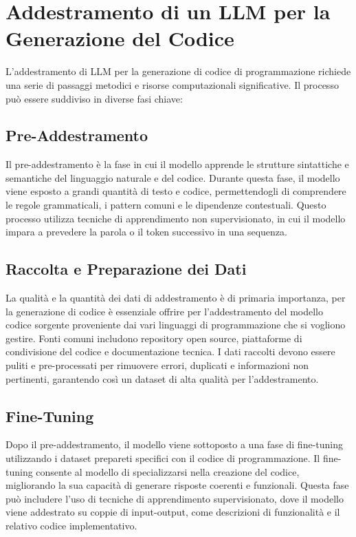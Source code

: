 \documentclass[12pt,a4paper,openright,twoside]{book}
\begin{document}
\chapter{Addestramento di un LLM per la Generazione del Codice}

L'addestramento di LLM per la generazione di codice di programmazione richiede una serie di passaggi metodici e risorse computazionali significative. Il processo può essere suddiviso in diverse fasi chiave:

\section{Pre-Addestramento}
Il pre-addestramento è la fase in cui il modello apprende le strutture sintattiche e semantiche del linguaggio naturale e del codice. Durante questa fase, il modello viene esposto a grandi quantità di testo e codice, permettendogli di comprendere le regole grammaticali, i pattern comuni e le dipendenze contestuali. Questo processo utilizza tecniche di apprendimento non supervisionato,
in cui il modello impara a prevedere la parola o il token successivo in una sequenza.

\section{Raccolta e Preparazione dei Dati}
La qualità e la quantità dei dati di addestramento è di primaria importanza, per la generazione di codice è essenziale offrire per l'addestramento del modello
codice sorgente proveniente dai vari linguaggi di programmazione che si vogliono gestire. Fonti comuni includono repository open source, piattaforme di condivisione del codice e documentazione tecnica. I dati raccolti devono essere puliti e pre-processati per rimuovere errori, duplicati e informazioni non pertinenti, garantendo così un dataset di alta qualità per l'addestramento.

\section{Fine-Tuning}
Dopo il pre-addestramento, il modello viene sottoposto a una fase di fine-tuning utilizzando i dataset  prepareti specifici con il codice di programmazione.
Il fine-tuning consente al modello di specializzarsi nella creazione del codice, migliorando la sua capacità di generare risposte coerenti e funzionali. Questa fase può includere l'uso di tecniche di apprendimento supervisionato, dove il modello viene addestrato su coppie di input-output, come descrizioni di funzionalità e il relativo codice implementativo.
\end{document}
